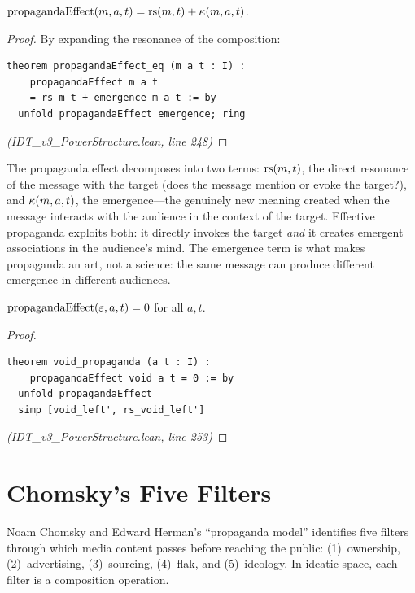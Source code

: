 \begin{theorem}
\label{thm:propaganda-eq}
$\mathrm{propagandaEffect}(m, a, t) = \mathrm{rs}(m, t) + \kappa(m, a, t)$.
\end{theorem}

\begin{proof}
By expanding the resonance of the composition:
\begin{lstlisting}
theorem propagandaEffect_eq (m a t : I) :
    propagandaEffect m a t
    = rs m t + emergence m a t := by
  unfold propagandaEffect emergence; ring
\end{lstlisting}
\textit{(IDT\_v3\_PowerStructure.lean, line 248)}
\end{proof}

\begin{interpretation}
The propaganda effect decomposes into two terms: $\mathrm{rs}(m, t)$, the direct
resonance of the message with the target (does the message mention or evoke the
target?), and $\kappa(m, a, t)$, the emergence---the genuinely new meaning
created when the message interacts with the audience in the context of the target.
Effective propaganda exploits both: it directly invokes the target \emph{and} it
creates emergent associations in the audience's mind. The emergence term is what
makes propaganda an art, not a science: the same message can produce different
emergence in different audiences.
\end{interpretation}

\begin{theorem}
\label{thm:void-propaganda}
$\mathrm{propagandaEffect}(\varepsilon, a, t) = 0$ for all $a, t$.
\end{theorem}

\begin{proof}
\begin{lstlisting}
theorem void_propaganda (a t : I) :
    propagandaEffect void a t = 0 := by
  unfold propagandaEffect
  simp [void_left', rs_void_left']
\end{lstlisting}
\textit{(IDT\_v3\_PowerStructure.lean, line 253)}
\end{proof}

\section{Chomsky's Five Filters}

Noam Chomsky and Edward Herman's ``propaganda model'' identifies five filters
through which media content passes before reaching the public: (1)~ownership,
(2)~advertising, (3)~sourcing, (4)~flak, and (5)~ideology. In ideatic space,
each filter is a composition operation.

